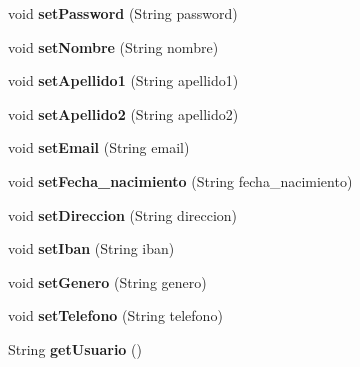 \begin{DoxyCompactItemize}
void {\bfseries set\+Password} (String password)
\item 
\mbox{\label{classobjetos_1_1_usuario_af80f3d60addfde641e49e66e6a1f5f8e}} 
void {\bfseries set\+Nombre} (String nombre)
\item 
\mbox{\label{classobjetos_1_1_usuario_a705188b9b04c0e4cfcad7f2973f7673e}} 
void {\bfseries set\+Apellido1} (String apellido1)
\item 
\mbox{\label{classobjetos_1_1_usuario_a73a071e063ba33c64d1453bf788b1d2f}} 
void {\bfseries set\+Apellido2} (String apellido2)
\item 
\mbox{\label{classobjetos_1_1_usuario_ad64ef1b4bc35e4039e9e5f31d651e043}} 
void {\bfseries set\+Email} (String email)
\item 
\mbox{\label{classobjetos_1_1_usuario_a5d99fa41f8ec817e0eca78ef718a3771}} 
void {\bfseries set\+Fecha\+\_\+nacimiento} (String fecha\+\_\+nacimiento)
\item 
\mbox{\label{classobjetos_1_1_usuario_a617d6485d3c99725d35a7f37093a72cf}} 
void {\bfseries set\+Direccion} (String direccion)
\item 
\mbox{\label{classobjetos_1_1_usuario_a1dd10cd5dfebcd7cf424a877839c1079}} 
void {\bfseries set\+Iban} (String iban)
\item 
\mbox{\label{classobjetos_1_1_usuario_ac9905e666ce288e519fc087e23d25854}} 
void {\bfseries set\+Genero} (String genero)
\item 
\mbox{\label{classobjetos_1_1_usuario_a0ff938bea2a54afe1c1692e8944010e7}} 
void {\bfseries set\+Telefono} (String telefono)
\item 
\mbox{\label{classobjetos_1_1_usuario_a091d44abe53530995ec78cde4c574a1d}} 
String {\bfseries get\+Usuario} ()
\item 
\mbox{\label{classobjetos_1_1_usuario_a78a59647b3bfd56744741973ff9521ff}} 

\end{DoxyCompactItemize}
